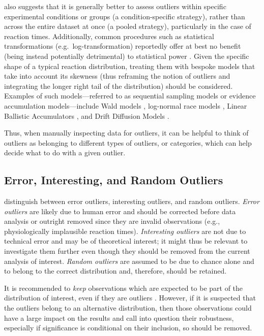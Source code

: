 \documentclass[sn-basic, lineno,pdflatex]{sn-jnl}
\begin{document}
\citet{miller2023outlier} also suggests that it is generally better to
assess outliers within specific experimental conditions or groups (a
condition-specific strategy), rather than across the entire dataset at
once (a pooled strategy), particularly in the case of reaction times.
Additionally, common procedures such as statistical transformations
(e.g.~log-transformation) reportedly offer at best no benefit (being
instead potentially detrimental) to statistical power
\citep{schramm2019reaction}. Given the specific shape of a typical
reaction distribution, treating them with bespoke models that take into
account its skewness (thus reframing the notion of outliers and
integrating the longer right tail of the distribution) should be
considered. Examples of such models---referred to as sequential sampling
models or evidence accumulation models---include Wald models
\citep{anders2016shifted}, log-normal race models
\citep{rouder2015lognormal}, Linear Ballistic Accumulators
\citep{brown2008simplest}, and Drift Diffusion Models
\citep{ratcliff2016diffusion}.

Thus, when manually inspecting data for outliers, it can be helpful to
think of outliers as belonging to different types of outliers, or
categories, which can help decide what to do with a given outlier.

\subsection{Error, Interesting, and Random
Outliers}\label{error-interesting-and-random-outliers}

\citet{leys2019outliers} distinguish between error outliers, interesting
outliers, and random outliers. \emph{Error outliers} are likely due to
human error and should be corrected before data analysis or outright
removed since they are invalid observations (e.g., physiologically
implausible reaction times). \emph{Interesting outliers} are not due to
technical error and may be of theoretical interest; it might thus be
relevant to investigate them further even though they should be removed
from the current analysis of interest. \emph{Random outliers} are
assumed to be due to chance alone and to belong to the correct
distribution and, therefore, should be retained.

It is recommended to \emph{keep} observations which are expected to be
part of the distribution of interest, even if they are outliers
\citep{leys2019outliers}. However, if it is suspected that the outliers
belong to an alternative distribution, then those observations could
have a large impact on the results and call into question their
robustness, especially if significance is conditional on their
inclusion, so should be removed.
\end{document}
